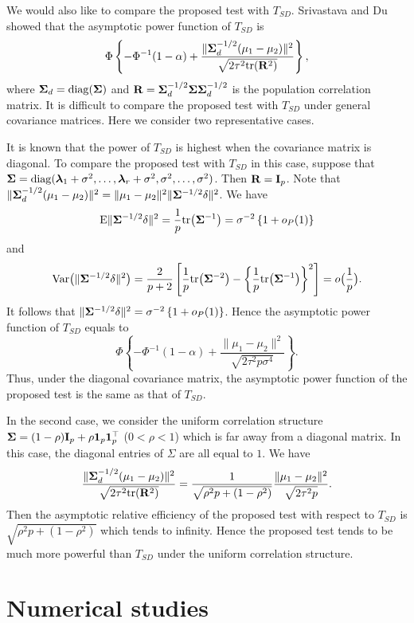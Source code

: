 \documentclass[times,sort&compress,3p]{elsarticle}
\newcommand{\mytr}{ {\rm tr} }
\newcommand{\mydiag}{ {\rm diag} }
\newcommand{\myE}{ {\rm E} }
\newcommand{\myVar}{ {\rm Var} }
\newcommand{\bfsym}[1]{\ensuremath{\boldsymbol{#1}}}
\def\blambda {\bfsym {\lambda}}        \def\bLambda {\bfsym {\Lambda}}
\theoremstyle{plain}
\theoremstyle{definition}
\theoremstyle{remark}
\begin{document}
 We would also like to compare the proposed test with $T_{SD}$. Srivastava and Du~\cite{Srivastava2008A} showed that the asymptotic power function of $T_{SD}$ is
 $$
 \Phi\left\{-\Phi^{-1}(1-\alpha)+\frac{\|\bSigma_d^{-1/2}(\mu_1-\mu_2)\|^2}{\sqrt{2\tau^2\mytr(\BR^2)}}\right\},
 $$
 where $\bSigma_d=\mydiag(\bSigma)$ and $\BR=\bSigma_d^{-1/2} \bSigma \bSigma_d^{-1/2}$ is the population correlation matrix.
 It is difficult to compare the proposed test with $T_{SD}$ under general covariance matrices.
 Here we consider two representative cases.


 It is known that the power of $T_{SD}$ is highest when the covariance matrix is diagonal.
 To compare the proposed test with $T_{SD}$ in this case,
suppose that $\bSigma=\mydiag(\blambda_1+\sigma^2,\ldots,\blambda_r+\sigma^2,\sigma^2,\ldots,\sigma^2)$. Then $\mathbf{R}=\mathbf{I}_p$.
 Note that $\|\bSigma_d^{-1/2}(\mu_1-\mu_2)\|^2=\|\mu_1-\mu_2\|^2 \|\bSigma^{-1/2}\delta\|^2$.
 We have 
 $$\myE\|\bSigma^{-1/2}\delta\|^2=
 \frac{1}{p}\mytr\big(\bSigma^{-1}\big)
 =\sigma^{-2} \left\{1+o_P(1)\right\}
 $$
and
 $$
 \myVar\big( \|\bSigma^{-1/2}\delta\|^2 \big)=\frac{2}{p+2}\left[\frac{1}{p}\mytr\big(\bSigma^{-2}\big)-\left\{\frac{1}{p}\mytr\big(\bSigma^{-1}\big)\right\}^2\right]=o\big(\frac{1}{p}\big).$$
 It follows that $\|\bSigma^{-1/2}\delta\|^2=\sigma^{-2}\left\{ 1+o_P(1)\right\}$. Hence the asymptotic power function of $T_{SD}$ equals to
 $$
 \Phi\left\{-\Phi^{-1}(1-\alpha)+\frac{\|\mu_1-\mu_2\|^2}{\sqrt{2\tau^2 p\sigma^4}}\right\}.
 $$
 Thus, under the diagonal covariance matrix, the asymptotic power function of the proposed test is the same as that of $T_{SD}$.

In the second case, we consider the uniform correlation structure $\bSigma=(1-\rho)\BI_p+\rho \mathbf{1}_p\mathbf{1}_p^\top $ ($0<\rho <1$) which is far away from a diagonal matrix.
 In this case, the diagonal entries of $\Sigma$ are all equal to $1$. 
 We have
 $$
 \frac{\|\bSigma_d^{-1/2}(\mu_1-\mu_2)\|^2}{\sqrt{2\tau^2\mytr(\BR^2)}}
 =
 \frac{1}{\sqrt{\rho^2 p +(1-\rho^2)}}\frac{\|\mu_1-\mu_2\|^2}{\sqrt{2\tau^2p}}.
 $$
 Then the asymptotic relative efficiency of the proposed test with respect to $T_{SD}$ is
 $\sqrt{\rho^2 p +(1-\rho^2)}$ which tends to infinity.
 Hence the proposed test tends to be much more powerful than $T_{SD}$ under the uniform correlation structure.






\section{Numerical studies}
\end{document}
